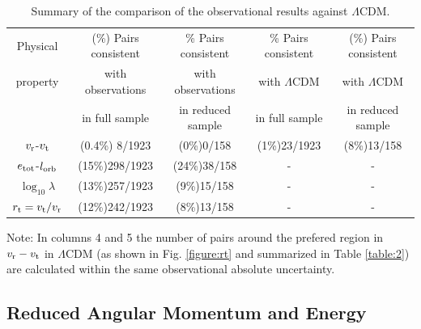 \documentclass{emulateapj}
\begin{document}
\begin{table}
\caption{Summary of the comparison of the observational results
  against $\Lambda$CDM.}
\begin{center}
\begin{tabular}{ccccc}\hline
Physical & (\%) Pairs consistent & \% Pairs consistent & \% Pairs
consistent& (\%) Pairs consistent\\ 
property & with observations & with observations & with $\Lambda$CDM & with $\Lambda$CDM\\ 
 & in full sample & in reduced sample & in full sample & in reduced sample\\ \hline
$v_{\rm r}$-$v_{\rm t}$ & (0.4\%) 8/1923 & (0\%)0/158 & (1\%)23/1923 & (8\%)13/158\\
$e_{\rm tot}$-$l_{\rm orb}$ & (15\%)298/1923 & (24\%)38/158 & - & -\\
$\log_{10}\lambda$ & (13\%)257/1923 & (9\%)15/158 & - & -\\
$r_{\rm t}=v_{\rm t}/v_{\rm r}$& (12\%)242/1923 & (8\%)13/158 & -& -\\\hline
\end{tabular}
\end{center}
\vspace{1mm}
Note: In columns 4 and 5 the number of pairs around the prefered region
in $v_{\rm r}-v_{\rm t}$ in $\Lambda$CDM (as shown in
Fig. \ref{figure:rt} and summarized in Table \ref{table:2}) are
calculated within the same observational absolute uncertainty.
\label{table:3}
\end{table}


\subsection{Reduced Angular Momentum and Energy}
\end{document}
